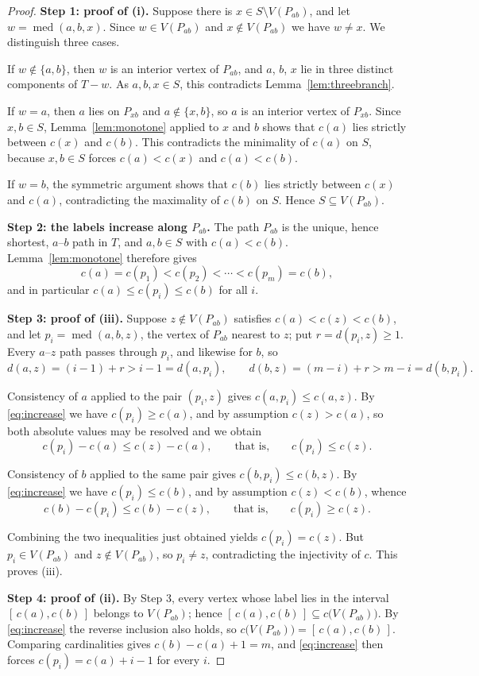 \documentclass[reqno,10pt]{article}
\theoremstyle{definition}
\numberwithin{equation}{section}
\numberwithin{theorem}{section}
\newcommand{\med}{\operatorname{med}}
\begin{document}
\begin{proof}
\textbf{Step 1: proof of (i).}
Suppose there is $x\in S\setminus V(P_{ab})$, and let $w=\med(a,b,x)$. Since
$w\in V(P_{ab})$ and $x\notin V(P_{ab})$ we have $w\ne x$. We distinguish
three cases.

If $w\notin\{a,b\}$, then $w$ is an interior vertex of $P_{ab}$, and $a$, $b$,
$x$ lie in three distinct components of $T-w$. As $a,b,x\in S$, this
contradicts Lemma~\ref{lem:threebranch}.

If $w=a$, then $a$ lies on $P_{xb}$ and $a\notin\{x,b\}$, so $a$ is an interior
vertex of $P_{xb}$. Since $x,b\in S$, Lemma~\ref{lem:monotone} applied to $x$
and $b$ shows that $c(a)$ lies strictly between $c(x)$ and $c(b)$. This
contradicts the minimality of $c(a)$ on $S$, because $x,b\in S$ forces
$c(a)<c(x)$ and $c(a)<c(b)$.

If $w=b$, the symmetric argument shows that $c(b)$ lies strictly between $c(x)$
and $c(a)$, contradicting the maximality of $c(b)$ on $S$. Hence
$S\subseteq V(P_{ab})$.

\medskip
\noindent\textbf{Step 2: the labels increase along $P_{ab}$.}
The path $P_{ab}$ is the unique, hence shortest, $a$--$b$ path in $T$, and
$a,b\in S$ with $c(a)<c(b)$. Lemma~\ref{lem:monotone} therefore gives
\begin{equation}
  c(a)=c(p_1)<c(p_2)<\cdots<c(p_m)=c(b),
  \label{eq:increase}
\end{equation}
and in particular $c(a)\le c(p_i)\le c(b)$ for all $i$.

\medskip
\noindent\textbf{Step 3: proof of (iii).}
Suppose $z\notin V(P_{ab})$ satisfies $c(a)<c(z)<c(b)$, and let
$p_i=\med(a,b,z)$, the vertex of $P_{ab}$ nearest to $z$; put
$r=d(p_i,z)\ge1$. Every $a$--$z$ path passes through $p_i$, and likewise for
$b$, so
\[
  d(a,z)=(i-1)+r>i-1=d(a,p_i),
  \qquad
  d(b,z)=(m-i)+r>m-i=d(b,p_i).
\]

Consistency of $a$ applied to the pair $(p_i,z)$ gives $c(a,p_i)\le c(a,z)$. By
\eqref{eq:increase} we have $c(p_i)\ge c(a)$, and by assumption $c(z)>c(a)$, so
both absolute values may be resolved and we obtain
\[
  c(p_i)-c(a)\le c(z)-c(a),
  \qquad\text{that is,}\qquad c(p_i)\le c(z).
\]

Consistency of $b$ applied to the same pair gives $c(b,p_i)\le c(b,z)$. By
\eqref{eq:increase} we have $c(p_i)\le c(b)$, and by assumption $c(z)<c(b)$,
whence
\[
  c(b)-c(p_i)\le c(b)-c(z),
  \qquad\text{that is,}\qquad c(p_i)\ge c(z).
\]

Combining the two inequalities just obtained yields $c(p_i)=c(z)$. But
$p_i\in V(P_{ab})$ and $z\notin V(P_{ab})$, so $p_i\ne z$, contradicting the
injectivity of $c$. This proves (iii).

\medskip
\noindent\textbf{Step 4: proof of (ii).}
By Step 3, every vertex whose label lies in the interval $[\,c(a),c(b)\,]$
belongs to $V(P_{ab})$; hence $[\,c(a),c(b)\,]\subseteq c\bigl(V(P_{ab})\bigr)$.
By \eqref{eq:increase} the reverse inclusion also holds, so
$c\bigl(V(P_{ab})\bigr)=[\,c(a),c(b)\,]$. Comparing cardinalities gives
$c(b)-c(a)+1=m$, and \eqref{eq:increase} then forces $c(p_i)=c(a)+i-1$ for
every $i$.
\end{proof}
\end{document}
